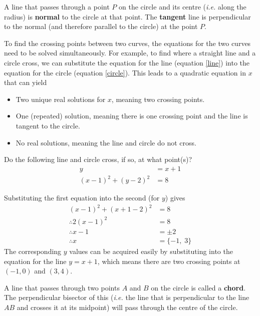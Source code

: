 \begin{definition} 
    A line that passes through a point $P$ on the circle and its centre (\emph{i.e.} along the radius) is \textbf{normal} to the circle at that point. The \textbf{tangent} line is perpendicular to the normal (and therefore parallel to the circle) at the point $P$.
\end{definition}

To find the crossing points between two curves, the equations for the two curves need to be solved simultaneously. For example, to find where a straight line and a circle cross, we can substitute the equation for the line (equation \eqref{line}) into the equation for the circle (equation \eqref{circle}). This leads to a quadratic equation in $x$ that can yield
\begin{itemize}
    \item Two unique real solutions for $x$, meaning two crossing points.
    \item One (repeated) solution, meaning there is one crossing point and the line is tangent to the circle.
    \item No real solutions, meaning the line and circle do not cross.
\end{itemize}

\begin{example}[Lecture]
Do the following line and circle cross, if so, at what point(s)?
\begin{align*}
    y &= x + 1 \\
    (x - 1)^2 + (y-2)^2 &= 8
\end{align*}
\end{example} 
\begin{solution}
Substituting the first equation into the second (for $y$) gives
\begin{align*}
    (x-1)^2 + (x+1-2)^2 &= 8\\
    \therefore 2(x-1)^2 &= 8\\
    \therefore x-1 &= \pm 2\\
    \therefore x &= \{-1,\; 3\}
\end{align*}
The corresponding $y$ values can be acquired easily by substituting into the equation for the line $y = x + 1$, which means there are two crossing points at $(-1,0)$ and $(3,4)$.
\end{solution}

\begin{definition}
    A line that passes through two points $A$ and $B$ on the circle is called a \textbf{chord}. The perpendicular bisector of this (\emph{i.e.} the line that is perpendicular to the line $AB$ and crosses it at its midpoint) will pass through the centre of the circle. %
\end{definition}

